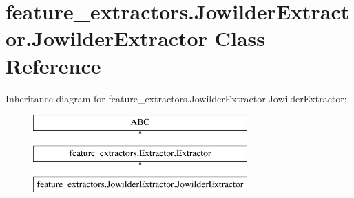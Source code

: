 \hypertarget{classfeature__extractors_1_1_jowilder_extractor_1_1_jowilder_extractor}{}\section{feature\+\_\+extractors.\+Jowilder\+Extractor.\+Jowilder\+Extractor Class Reference}
\label{classfeature__extractors_1_1_jowilder_extractor_1_1_jowilder_extractor}
Inheritance diagram for feature\+\_\+extractors.\+Jowilder\+Extractor.\+Jowilder\+Extractor\+:\begin{figure}[H]
\begin{center}
\leavevmode
\includegraphics[height=3.000000cm]{classfeature__extractors_1_1_jowilder_extractor_1_1_jowilder_extractor}
\end{center}
\end{figure}
